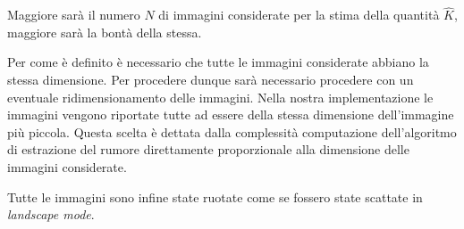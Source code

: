 Maggiore sarà il numero $N$ di immagini considerate per la stima della quantità $\hat{K}$, maggiore sarà la bontà della stessa.

Per come è definito è necessario che tutte le immagini considerate abbiano la stessa dimensione. Per procedere dunque sarà necessario procedere con un eventuale ridimensionamento delle immagini. Nella nostra implementazione le immagini vengono riportate tutte ad essere della stessa dimensione dell'immagine più piccola. Questa scelta è dettata dalla complessità computazione dell'algoritmo di estrazione del rumore direttamente proporzionale alla dimensione delle immagini considerate.

Tutte le immagini sono infine state ruotate come se fossero state scattate in \emph{landscape mode}.